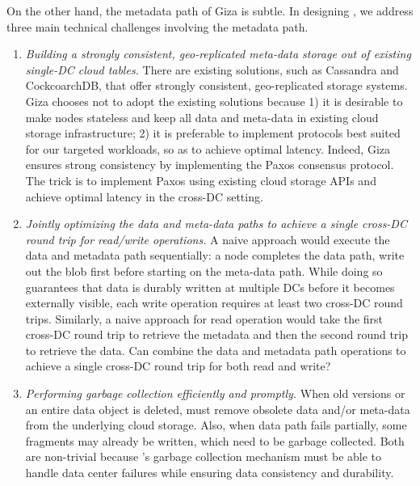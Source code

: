 On the other hand, the metadata path of Giza is subtle.
In designing \name, we address three main technical challenges involving the metadata path.
\begin{enumerate}

\item {\it Building a strongly consistent, geo-replicated meta-data storage out of existing 
single-DC cloud tables.}
There are existing solutions, such as Cassandra and CockcoarchDB,
that offer strongly consistent, geo-replicated storage systems.
Giza chooses not to adopt the existing solutions because
1) it is desirable to make \name nodes stateless and keep all data and meta-data
in existing cloud storage infrastructure;
2) it is preferable to implement protocols best suited for our targeted workloads,
so as to achieve optimal latency.
Indeed, Giza ensures strong consistency by implementing the Paxos consensus protocol.
The trick is to implement Paxos using existing cloud storage APIs and achieve 
optimal latency in the cross-DC setting.

\item {\it Jointly optimizing the data and meta-data paths to achieve a single
cross-DC round trip for read/write operations.}
A naive approach would execute the data and metadata path sequentially:
a \name node completes the data path, write out the blob first before starting on the meta-data path.
While doing so guarantees that data is durably written at multiple DCs
before it becomes externally visible, each write operation requires at least two cross-DC round trips.
Similarly, a naive approach for read operation would take the first cross-DC round trip to retrieve the metadata
and then the second round trip to retrieve the data.
Can \name combine the data and metadata path operations to achieve a single cross-DC round trip for both read and write?

\item {\it Performing garbage collection efficiently and promptly.} 
When old versions or an entire data object is deleted,
\name must remove obsolete data and/or meta-data from the underlying cloud storage.
Also, when data path fails partially, some fragments may already be written,
which need to be garbage collected.
Both are non-trivial because \name's garbage 
collection mechanism must be able to handle data center failures
while ensuring data consistency and durability.

\end{enumerate}

%



